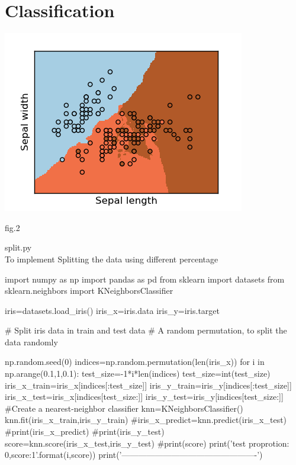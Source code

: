 \documentclass[a4pper,11pt,onecolumn]{article}
\begin{document}
\section{Classification}

\includegraphics[width=\linewidth]{plot_knn_iris_1.png}
\centerline{fig.2}

split.py\\
To implement Splitting the data using different percentage
\begin{python}
import numpy as np
import pandas as pd
from sklearn import datasets
from sklearn.neighbors import KNeighborsClassifier

iris=datasets.load_iris()
iris_x=iris.data
iris_y=iris.target

# Split iris data in train and test data
# A random permutation, to split the data randomly

np.random.seed(0)
indices=np.random.permutation(len(iris_x))
for i in np.arange(0.1,1,0.1):
test_size=-1*i*len(indices)
test_size=int(test_size)
iris_x_train=iris_x[indices[:test_size]]
iris_y_train=iris_y[indices[:test_size]]
iris_x_test=iris_x[indices[test_size:]]
iris_y_test=iris_y[indices[test_size:]]
#Create a nearest-neighbor classifier
knn=KNeighborsClassifier()
knn.fit(iris_x_train,iris_y_train)
#iris_x_predict=knn.predict(iris_x_test)
#print(iris_x_predict)
#print(iris_y_test)
score=knn.score(iris_x_test,iris_y_test)
#print(score)
print('test proprotion: {0},\nevaluate score:{1}'.format(i,score))
print('-------------------------------------------------')
\end{python}
\end{document}
